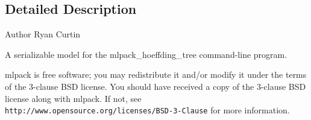 \subsection{Detailed Description}
\begin{DoxyAuthor}{Author}
Ryan Curtin
\end{DoxyAuthor}
A serializable model for the mlpack\+\_\+hoeffding\+\_\+tree command-\/line program.

mlpack is free software; you may redistribute it and/or modify it under the terms of the 3-\/clause B\+SD license. You should have received a copy of the 3-\/clause B\+SD license along with mlpack. If not, see {\tt http\+://www.\+opensource.\+org/licenses/\+B\+S\+D-\/3-\/\+Clause} for more information. 